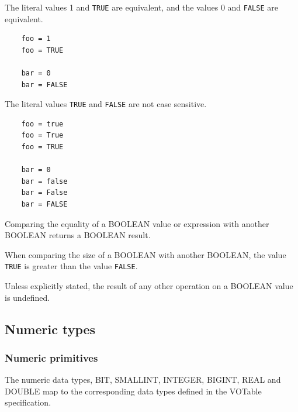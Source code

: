 \documentclass[11pt,a4paper]{ivoa}
\newcommand{\VOTspec}  {VOTable specification\xspace}
\begin{document}
The literal values 1 and \verb:TRUE: are equivalent,
and the values 0 and \verb:FALSE: are equivalent.  

\begin{verbatim}
    foo = 1
    foo = TRUE

    bar = 0
    bar = FALSE
\end{verbatim}

The literal values \verb:TRUE: and \verb:FALSE:
are not case sensitive.  

\begin{verbatim}
    foo = true
    foo = True
    foo = TRUE

    bar = 0
    bar = false
    bar = False
    bar = FALSE
\end{verbatim}

Comparing the equality of a BOOLEAN value or expression with another
BOOLEAN returns a BOOLEAN result.

When comparing the size of a BOOLEAN with another BOOLEAN, the value
\verb:TRUE: is greater than the value \verb:FALSE:.

Unless explicitly stated, the result of any other operation on a BOOLEAN
value is undefined.

\subsection{Numeric types}
\label{sec:types.numeric}

\subsubsection{Numeric primitives}
\label{sec:types.numeric.primitive}

The numeric data types, BIT, SMALLINT, INTEGER, BIGINT, REAL
and DOUBLE map to the corresponding data types defined
in the \VOTspec.
\end{document}
